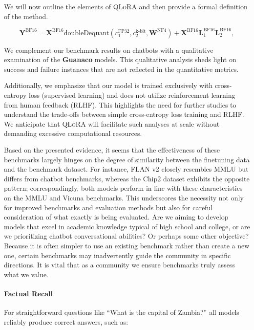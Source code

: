 We will now outline the elements of \textsc{QLoRA} and then provide a formal definition of the method.

\begin{equation}
    \mathbf{Y}^{\text{BF16}} =  \mathbf{X}^{\text{BF16}} \text{doubleDequant}(c_1^{\text{FP32}}, c_2^{\text{k-bit}}, \mathbf{W}^{\text{NF4}}) + \mathbf{X}^{\text{BF16}}\mathbf{L}^{\text{BF16}}_1\mathbf{L}^{\text{BF16}}_2,
\end{equation}

We complement our benchmark results on chatbots with a qualitative examination of the \textbf{Guanaco} models. This qualitative analysis sheds light on success and failure instances that are not reflected in the quantitative metrics.

Additionally, we emphasize that our model is trained exclusively with cross-entropy loss (supervised learning) and does not utilize reinforcement learning from human feedback (RLHF). This highlights the need for further studies to understand the trade-offs between simple cross-entropy loss training and RLHF. We anticipate that \textsc{QLoRA} will facilitate such analyses at scale without demanding excessive computational resources.

Based on the presented evidence, it seems that the effectiveness of these benchmarks largely hinges on the degree of similarity between the finetuning data and the benchmark dataset. For instance, FLAN v2 closely resembles MMLU but differs from chatbot benchmarks, whereas the Chip2 dataset exhibits the opposite pattern; correspondingly, both models perform in line with these characteristics on the MMLU and Vicuna benchmarks. This underscores the necessity not only for improved benchmarks and evaluation methods but also for careful consideration of what exactly is being evaluated. Are we aiming to develop models that excel in academic knowledge typical of high school and college, or are we prioritizing chatbot conversational abilities? Or perhaps some other objective? Because it is often simpler to use an existing benchmark rather than create a new one, certain benchmarks may inadvertently guide the community in specific directions. It is vital that as a community we ensure benchmarks truly assess what we value.

\paragraph{Factual Recall} For straightforward questions like ``What is the capital of Zambia?'' all models reliably produce correct answers, such as:

